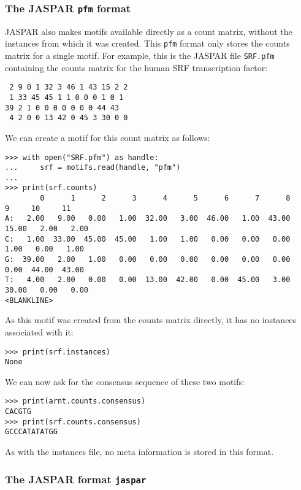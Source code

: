 \subsubsection*{The JASPAR \texttt{pfm} format}

JASPAR also makes motifs available directly as a count matrix,
without the instances from which it was created. This \verb+pfm+ format only
stores the counts matrix for a single motif.
For example, this is the JASPAR file \verb+SRF.pfm+ containing the counts matrix for the human SRF transcription factor:
\begin{verbatim}
 2 9 0 1 32 3 46 1 43 15 2 2
 1 33 45 45 1 1 0 0 0 1 0 1
39 2 1 0 0 0 0 0 0 0 44 43
 4 2 0 0 13 42 0 45 3 30 0 0
\end{verbatim}
We can create a motif for this count matrix as follows:

\begin{verbatim}
>>> with open("SRF.pfm") as handle:
...     srf = motifs.read(handle, "pfm")
...
>>> print(srf.counts)
        0      1      2      3      4      5      6      7      8      9     10     11
A:   2.00   9.00   0.00   1.00  32.00   3.00  46.00   1.00  43.00  15.00   2.00   2.00
C:   1.00  33.00  45.00  45.00   1.00   1.00   0.00   0.00   0.00   1.00   0.00   1.00
G:  39.00   2.00   1.00   0.00   0.00   0.00   0.00   0.00   0.00   0.00  44.00  43.00
T:   4.00   2.00   0.00   0.00  13.00  42.00   0.00  45.00   3.00  30.00   0.00   0.00
<BLANKLINE>
\end{verbatim}
As this motif was created from the counts matrix directly, it has no instances associated with it:

\begin{verbatim}
>>> print(srf.instances)
None
\end{verbatim}
We can now ask for the consensus sequence of these two motifs:

\begin{verbatim}
>>> print(arnt.counts.consensus)
CACGTG
>>> print(srf.counts.consensus)
GCCCATATATGG
\end{verbatim}

As with the instances file, no meta information is stored in this format.

\subsubsection*{The JASPAR format \texttt{jaspar}}

